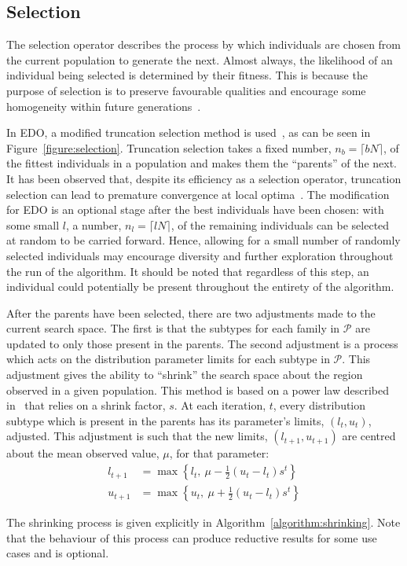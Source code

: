 \subsection{Selection}

The selection operator describes the process by which individuals are chosen
from the current population to generate the next. Almost always, the likelihood
of an individual being selected is determined by their fitness. This is because
the purpose of selection is to preserve favourable qualities and encourage some
homogeneity within future generations~\cite{Back1994}.



In EDO, a modified truncation selection method is used~\cite{Jebari2013}, as can
be seen in Figure~\ref{figure:selection}. Truncation selection takes a fixed
number, \(n_b = \lceil bN\rceil\), of the fittest individuals in a population
and makes them the ``parents'' of the next. It has been observed that, despite
its efficiency as a selection operator, truncation selection can lead to
premature convergence at local optima~\cite{Jebari2013, Tatsuya2002}. The
modification for EDO is an optional stage after the best individuals have been
chosen: with some small \(l\), a number, \(n_l = \lceil lN\rceil\), of the
remaining individuals can be selected at random to be carried forward. Hence,
allowing for a small number of randomly selected individuals may encourage
diversity and further exploration throughout the run of the algorithm. It should
be noted that regardless of this step, an individual could potentially be
present throughout the entirety of the algorithm.

After the parents have been selected, there are two adjustments made to the
current search space. The first is that the subtypes for each family in
\(\mathcal{P}\) are updated to only those present in the parents. The second
adjustment is a process which acts on the distribution parameter limits for
each subtype in \(\mathcal{P}\). This adjustment gives the ability to ``shrink''
the search space about the region observed in a given population. This method is
based on a power law described in~\cite{Amirjanov2016} that relies on a shrink
factor, \(s\). At each iteration, \(t\), every distribution subtype which is
present in the parents has its parameter's limits, \(\left(l_t, u_t\right)\),
adjusted. This adjustment is such that the new limits, \(\left(l_{t+1},
u_{t+1}\right)\) are centred about the mean observed value, \(\mu\), for that
parameter:
\begin{align}
    \label{eq:shrinking_lower}
    l_{t+1}&= \max \left\{l_t, \ \mu - \frac{1}{2} (u_t - l_t) s^t\right\}\\
    \label{eq:shrinking_upper}
    u_{t+1}&= \max \left\{u_t, \ \mu + \frac{1}{2} (u_t - l_t) s^t\right\}
\end{align}

The shrinking process is given explicitly in
Algorithm~\ref{algorithm:shrinking}. Note that the behaviour of this process can 
produce reductive results for some use cases and is optional.


